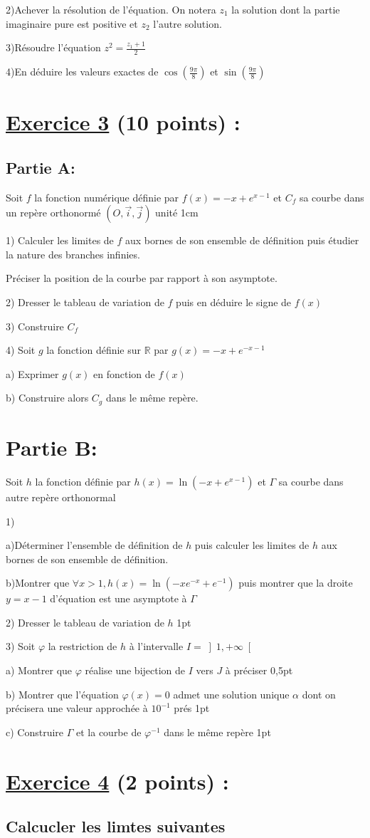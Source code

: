 \documentclass{article}
\begin{document}
2)Achever la résolution de l’équation. On notera $z_{1}$ la solution dont la partie imaginaire pure est positive et $z_{2}$ l’autre solution.

3)Résoudre l’équation $z^{2}=\frac{z_{1}+1}{2}$

4)En déduire les valeurs exactes de $\cos(\frac{9\pi}{8})$ et $\sin(\frac{9\pi}{8})$
\section*{\underline{Exercice 3} (10 points) :}
\subsection*{Partie A:}
Soit $f$ la fonction numérique définie par $f(x)=-x+e^{x-1}$  et $C_{f}$ sa courbe dans un repère orthonormé $(O,\vec{i},\vec{j})$ unité 1cm

1) Calculer les limites de $f$ aux bornes de son ensemble de définition puis étudier la nature des branches infinies. 

Préciser la position de la courbe par rapport à son asymptote.

2) Dresser le tableau de variation de $f$ puis en déduire le signe de $f(x)$

3) Construire $C_{f}$ 

4) Soit $g$ la fonction définie sur $\mathbb{R}$ par $g(x)=-x+e^{-x-1}$

  a) Exprimer $g(x)$ en fonction de $f(x)$   
  
  b) Construire alors $C_{g}$ dans le même repère.
\section*{Partie B:}
Soit $h$ la fonction définie par $h(x)=\ln(-x+e^{x-1})$  et $\Gamma$ sa courbe dans autre repère orthonormal

1)

	a)Déterminer l’ensemble de définition de $h$ puis calculer les limites de $h$ aux bornes de son ensemble de définition.
	
	b)Montrer que $\forall x>1, h(x)=\ln(-xe^{-x}+e^{-1}) $ puis montrer que la droite $y=x-1$ d’équation est une asymptote à $\Gamma$ 
	
2) Dresser le tableau de variation de  $h$  1pt
    
3) Soit $\varphi$ la restriction de $h$ à l’intervalle $I=\left] 1, +\infty \right[ $
    
    a) Montrer que $\varphi$  réalise une bijection de $I$ vers $J$  à préciser 0,5pt
        
    b) Montrer que l’équation $\varphi(x)=0$ admet une solution unique $\alpha$ dont on précisera une valeur approchée à $10^{-1}$ prés  1pt
    
    c) Construire $\Gamma$ et la courbe de $\varphi^{-1}$  dans le même repère  1pt
\section*{\underline{Exercice 4} (2 points) :}
\subsection*{Calcucler les limtes suivantes}
\end{document}
